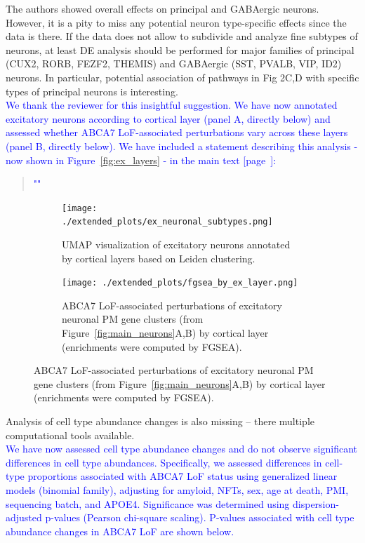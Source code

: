 \documentclass[12pt]{article}
\begin{document}
The authors showed overall effects on principal and GABAergic neurons. However, it is a pity to miss any potential neuron type-specific effects since the data is there. If the data does not allow to subdivide and analyze fine subtypes of neurons, at least DE analysis should be performed for major families of principal (CUX2, RORB, FEZF2, THEMIS) and GABAergic (SST, PVALB, VIP, ID2) neurons. In particular, potential association of pathways in Fig 2C,D with specific types of principal neurons is interesting.\\
\textcolor{blue}{We thank the reviewer for this insightful suggestion. We have now annotated excitatory neurons according to cortical layer (panel A, directly below) and assessed whether ABCA7 LoF-associated perturbations vary across these layers (panel B, directly below). We have included a statement describing this analysis - now shown in Figure~\ref{fig:ex_layers} - in the main text [page~\pageref{quoteLayer-label}]:}

\begin{quote}
	\textcolor{blue}{"\quoteLayer"}
\end{quote}

\begin{figure}[H]
	\centering
	\begin{subfigure}[t]{.5\textwidth}
	\caption{UMAP visualization of excitatory neurons annotated by cortical layers based on Leiden clustering.}
	\texttt{[image: ./extended\_plots/ex\_neuronal\_subtypes.png]}        
	\end{subfigure} 
	\begin{subfigure}[t]{\textwidth}
	\caption{ABCA7 LoF-associated perturbations of excitatory neuronal PM gene clusters (from Figure~\ref{fig:main_neurons}A,B) by cortical layer (enrichments were computed by FGSEA).}
	\texttt{[image: ./extended\_plots/fgsea\_by\_ex\_layer.png]}        
	\end{subfigure} 
\end{figure}


Analysis of cell type abundance changes is also missing – there multiple computational tools available.\\
\textcolor{blue}{We have now assessed cell type abundance changes and do not observe significant differences in cell type abundances. Specifically, we assessed differences in cell-type proportions associated with ABCA7 LoF status using generalized linear models (binomial family), adjusting for amyloid, NFTs, sex, age at death, PMI, sequencing batch, and APOE4. Significance was determined using dispersion-adjusted p-values (Pearson chi-square scaling). P-values associated with cell type abundance changes in ABCA7 LoF are shown below.}
\end{document}
